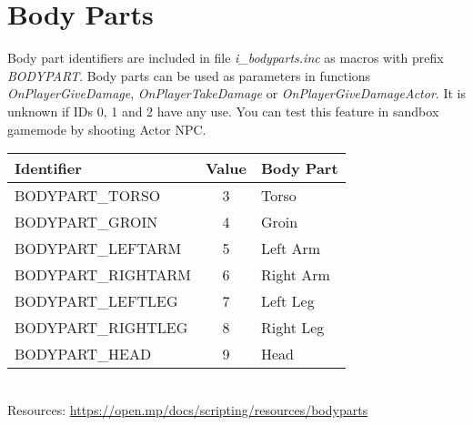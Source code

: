 \documentclass{article}
\begin{document}
\newpage
\section{Body Parts}
\begin{sloppypar}
Body part identifiers are included in file \textit{i\_bodyparts.inc} as macros with prefix \textit{BODYPART}. Body parts can be used as parameters in functions \textit{OnPlayerGiveDamage}, \textit{OnPlayerTakeDamage} or \textit{OnPlayerGiveDamageActor}. It is unknown if IDs 0, 1 and 2 have any use. You can test this feature in sandbox gamemode by shooting Actor NPC.
\end{sloppypar}
\bigskip
\noindent\begin{tabular}{ |l|c|l| } 
\hline
Identifier & Value & Body Part \\
\hline
BODYPART\_TORSO & 3 & Torso \\ 
BODYPART\_GROIN & 4 & Groin \\
BODYPART\_LEFTARM & 5 & Left Arm \\
BODYPART\_RIGHTARM & 6 & Right Arm \\
BODYPART\_LEFTLEG & 7 & Left Leg \\
BODYPART\_RIGHTLEG & 8 & Right Leg \\
BODYPART\_HEAD & 9 & Head \\
\hline
\end{tabular}
\bigskip
\\Resources: \url{https://open.mp/docs/scripting/resources/bodyparts}
\end{document}
